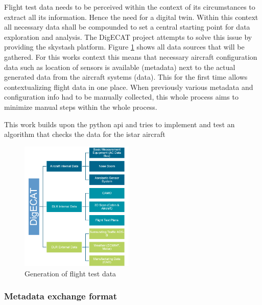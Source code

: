 Flight test data needs to be perceived within the context of its circumstances to extract all its information. Hence the need for a digital twin. Within this context all necessary data shall be compounded to set a central starting point for data exploration and analysis. The DigECAT project attempts to solve this issue by providing the skystash platform. Figure \ref{fig:digecat_data_sources} shows all data sources that will be gathered. For this works context this means that necessary aircraft configuration data such as location of sensors is available (metadata) next to the actual generated data from the aircraft systems (data). This for the first time allows contextualizing flight data in one place. When previously various metadata and configuration info had to be manually collected, this whole process aims to minimize manual steps within the whole process.

\cite{arts_digital_nodate}


This work builds upon the python api and tries to implement and test an algorithm that checks the data for the istar aircraft
\cite{meyer_development_2020}


\begin{figure}
    \begin{center}
    \includegraphics[width=0.48\textwidth]{03_figures/DIGECAT}
      \end{center}
    \caption{Generation of flight test data \cite{arts_digital_nodate} }
    \label{fig:digecat_data_sources}

\end{figure}

\subsubsection{Metadata exchange format}

